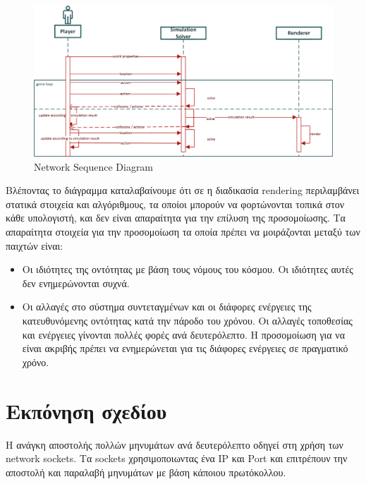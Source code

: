 		\begin{figure}[h]
			\centering
			\includegraphics[width=140mm]{Images/gameloop_network_sequence}
			\caption{Network Sequence Diagram}
			\label{fig:Network_Sequence_Diagram}
		\end{figure}		
		
		Βλέποντας το διάγραμμα καταλαβαίνουμε ότι σε η διαδικασία rendering περιλαμβάνει στατικά στοιχεία και αλγόριθμους, τα οποίοι μπορούν να φορτώνονται τοπικά στον κάθε υπολογιστή, και δεν είναι απαραίτητα για την επίλυση της προσομοίωσης. Τα απαραίτητα στοιχεία για την προσομοίωση τα οποία πρέπει να μοιράζονται μεταξύ των παιχτών είναι:
		\begin{itemize}
			\item Oι ιδιότητες της οντότητας με βάση τους νόμους του κόσμου. Οι ιδιότητες αυτές δεν ενημερώνονται συχνά.
			\item Οι αλλαγές στο σύστημα συντεταγμένων και οι διάφορες ενέργειες της κατευθυνόμενης οντότητας κατά την πάροδο του χρόνου. Οι αλλαγές τοποθεσίας και ενέργειες γίνονται πολλές φορές ανά δευτερόλεπτο. Η προσομοίωση για να είναι ακριβής πρέπει να ενημερώνεται για τις διάφορες ενέργειες σε πραγματικό χρόνο.
		\end{itemize}
				
		\section{Εκπόνηση σχεδίου}	
		Η ανάγκη αποστολής πολλών μηνυμάτων ανά δευτερόλεπτο οδηγεί στη χρήση των network sockets. Τα sockets χρησιμοποιωντας ένα IP και  Port και επιτρέπουν την αποστολή και παραλαβή μηνυμάτων με βάση κάποιου πρωτόκολλου.
		
